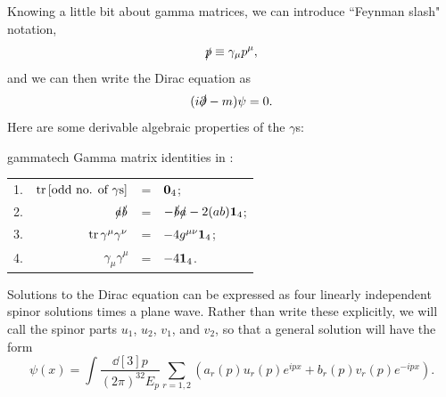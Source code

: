 
Knowing a little bit about gamma matrices, we can introduce
``Feynman slash" notation,
\begin{equation}
  \slashed{p}\equiv\gamma_\mu p^\mu,
\end{equation}
and we can then write the Dirac equation as 
\begin{equation}
  (i\slashed{\partial}-m)\psi=0.
\end{equation}
Here are some derivable algebraic properties of the $\gamma$s:
\begin{proposition}{}{gammatech}
Gamma matrix identities in :
\begin{center}\begin{tabular}{lrcl}
1. &$\tr\left[\text{odd no. of $\gamma$s}\right]$ &=& ${\mathbf 0}_4$;\\
2. &$\slashed{a}\slashed{b}$ &=& $-\slashed{b}\slashed{a}-2(ab){\mathbf 1}_4$;\\
3. &$\tr\gamma^\mu\gamma^\nu$ &=& $-4g^{\mu\nu}{\mathbf 1}_4$;\\
4. &$\gamma_\mu\gamma^\mu$&=& $-4{\mathbf 1}_4$. 
\end{tabular}\end{center}
\end{proposition}

Solutions to the Dirac equation can be expressed as four linearly independent
spinor solutions times a plane wave. Rather than write these explicitly, we will
call the spinor parts $u_1$, $u_2$, $v_1$, and $v_2$, so that a general solution
will have the form
\begin{equation}
\psi(x)=\int\frac{\dd[3]{p}}{(2\pi)^32E_p}
\sum_{r=1,2}\left(a_r(p)u_r(p)e^{ipx}+b_r(p)v_r(p)e^{-ipx}\right).
\end{equation}

